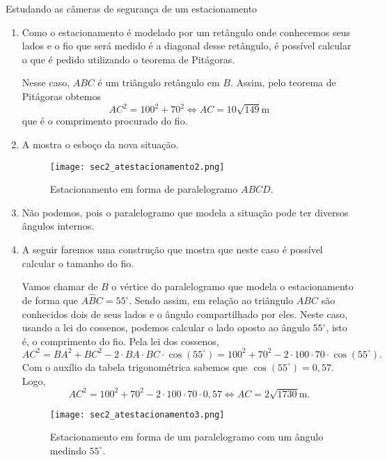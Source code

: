 \begin{answer}{Estudando as câmeras de segurança de um estacionamento}
{
\setcounter{enumi}{1}
\begin{enumerate}
\item Como o estacionamento é modelado por um retângulo onde conhecemos seus lados e o fio que será medido é a diagonal desse retângulo, é possível calcular o que é pedido utilizando o teorema de Pitágoras. 
    
    Nesse caso, $ABC$ é um triângulo retângulo em $B$. Assim, pelo teorema de Pitágoras obtemos 
    $$AC^2=100^2+70^2 \iff AC=10\sqrt{149}\text{m}$$
    que é o comprimento procurado do fio.

    \item{}
    A  mostra o esboço da nova situação.
    \begin{figure}[H]
        \centering
        \texttt{[image: sec2\_atestacionamento2.png]}
        \caption{Estacionamento em forma de paralelogramo $ABCD$.}
        \label{sec2_resatestacionamento2}
    \end{figure}

    \item{}
    Não podemos, pois o paralelogramo que modela a situação pode ter diversos ângulos internos. 

    \item{}
    A seguir faremos uma construção que mostra que neste caso é possível calcular o tamanho do fio.
    
    Vamos chamar de $B$ o vértice do paralelogramo que modela o estacionamento de forma que $A\hat{B}C=55^\circ$. Sendo assim, em relação ao triângulo $ABC$ são conhecidos dois de seus lados e o ângulo compartilhado por eles. Neste caso, usando a lei do cossenos, podemos calcular o lado oposto ao ângulo $55^\circ$, isto é, o comprimento do fio.
    Pela lei dos cossenos,
    $$AC^2=BA^2+BC^2-2\cdot BA\cdot BC\cdot \cos(55^\circ)=100^2+70^2-2\cdot100\cdot70\cdot \cos(55^\circ).$$
    Com o auxílio da tabela trigonométrica sabemos que $\cos(55^\circ)=0,57$. Logo,
    $$AC^2=100^2+70^2-2\cdot100\cdot70\cdot 0,57 \iff AC=2\sqrt{1730}\text{m}.$$
    \begin{figure}[H]
        \centering
        \texttt{[image: sec2\_atestacionamento3.png]}
        \caption{Estacionamento em forma de um paralelogramo com um ângulo medindo $55^\circ$.}
        \label{sec2_resatestacionamento3}
    \end{figure}
    

\end{enumerate}}
\end{answer}

